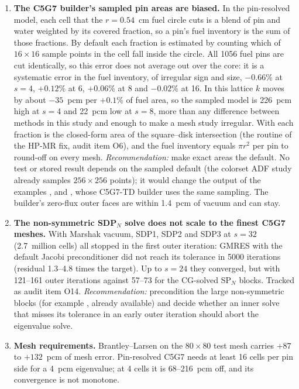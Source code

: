 \begin{enumerate}
\item \textbf{The C5G7 builder's sampled pin areas are biased.} In the
  pin-resolved model, each cell that the $r = 0.54$~cm fuel circle cuts is a
  blend of pin and water weighted by its covered fraction, so a pin's fuel
  inventory is the sum of those fractions. By default each fraction is
  estimated by counting which of $16 \times 16$ sample points in the cell fall
  inside the circle. All 1056 fuel pins are cut identically, so this error
  does not average out over the core: it is a systematic error in the fuel
  inventory, of irregular sign and size, $-0.66$\% at $s = 4$, $+0.12$\% at 6,
  $+0.06$\% at 8 and $-0.02$\% at 16. In this lattice $k$ moves by about
  $-35$~pcm per $+0.1$\% of fuel area, so the sampled model is 226~pcm high at
  $s = 4$ and 22~pcm low at $s = 8$, more than any difference between methods
  in this study and enough to make a mesh study irregular. With
   each fraction is the closed-form area of the
  square--disk intersection (the routine of the HP-MR fix, audit item O6), and
  the fuel inventory equals $\pi r^2$ per pin to round-off on every mesh.
  \emph{Recommendation:} make exact areas the default. No test or stored
  result depends on the sampled default (the colorset ADF study already
  samples $256 \times 256$ points); it would change the output of the
  examples ,  and
  , whose C5G7-TD builder uses the same
  sampling. The builder's zero-flux outer faces are within 1.4~pcm of vacuum
  and can stay.

\item \textbf{The non-symmetric SDP$_N$ solve does not scale to the finest
  C5G7 meshes.} With Marshak vacuum, SDP1, SDP2 and SDP3 at $s = 32$
  (2.7~million cells) all stopped in the first outer iteration: GMRES with
  the default Jacobi preconditioner did not reach its tolerance in 5000
  iterations (residual 1.3--4.8 times the target). Up to $s = 24$ they
  converged, but with 121--161 outer iterations against 57--73 for the
  CG-solved SP$_N$ blocks.
  Tracked as audit item O14. \emph{Recommendation:} precondition the large
  non-symmetric blocks (for example , already
  available) and decide whether an inner solve that misses its tolerance in
  an early outer iteration should abort the eigenvalue solve.

\item \textbf{Mesh requirements.} Brantley--Larsen on the
  $80 \times 80$ test mesh carries $+87$ to $+132$~pcm of mesh error.
  Pin-resolved C5G7 needs at least 16 cells per pin side for a 4~pcm
  eigenvalue; at 4 cells it is 68--216~pcm off, and its convergence is not
  monotone.


\end{enumerate}
